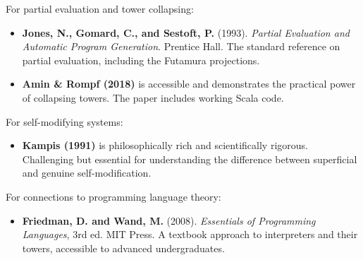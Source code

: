 For partial evaluation and tower collapsing:

\begin{itemize}
\item \textbf{Jones, N., Gomard, C., and Sestoft, P.} (1993). \textit{Partial Evaluation and Automatic Program Generation}. Prentice Hall. The standard reference on partial evaluation, including the Futamura projections.
\end{itemize}

\begin{itemize}
\item \textbf{Amin \& Rompf (2018)} is accessible and demonstrates the practical power of collapsing towers. The paper includes working Scala code.
\end{itemize}

For self-modifying systems:

\begin{itemize}
\item \textbf{Kampis (1991)} is philosophically rich and scientifically rigorous. Challenging but essential for understanding the difference between superficial and genuine self-modification.
\end{itemize}

For connections to programming language theory:

\begin{itemize}
\item \textbf{Friedman, D. and Wand, M.} (2008). \textit{Essentials of Programming Languages}, 3rd ed. MIT Press. A textbook approach to interpreters and their towers, accessible to advanced undergraduates.
\end{itemize}
